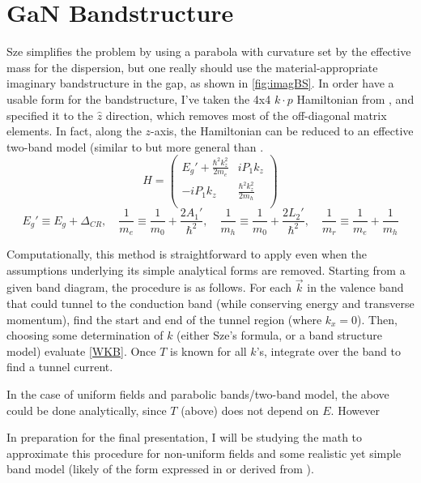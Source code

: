 \section{GaN Bandstructure}
Sze simplifies the problem by using a parabola with curvature set by the effective mass for the dispersion, but one really should use the material-appropriate imaginary bandstructure in the gap, as shown in \ref{fig:imagBS}.  In order have a usable form for the bandstructure, I've taken the 4x4 $k\cdot p$ Hamiltonian from \cite{Rinke_2008}, and specified it to the $\hat{z}$ direction, which removes most of the off-diagonal matrix elements.  In fact, along the $z$-axis, the Hamiltonian can be reduced to an effective two-band model (similar to but more general than \cite{Kane_1960}.
\[
  H=\begin{pmatrix}
    E_g'+\frac{\hbar^2k_z^2}{2m_e} & iP_1k_z\\
    -iP_1k_z & \frac{\hbar^2k_z^2}{2m_h} \\
  \end{pmatrix}
\]
\[
  E_g'\equiv E_g+\Delta_{CR}, \quad \frac{1}{m_e}\equiv\frac{1}{m_0}+\frac{2A_1'}{\hbar^2}, \quad \frac{1}{m_h}\equiv\frac{1}{m_0}+\frac{2L_2'}{\hbar^2}, \quad
\frac{1}{m_r}\equiv\frac{1}{m_e}+\frac{1}{m_h}
\]




Computationally, this method is straightforward to apply even when the assumptions underlying its simple analytical forms are removed.  Starting from a given band diagram, the procedure is as follows.  For each $\vec{k}$ in the valence band that could tunnel to the conduction band (while conserving energy and transverse momentum), find the start and end of the tunnel region (where $k_x=0$).  Then, choosing some determination of $k$ (either Sze's formula, or a band structure model) evaluate \ref{WKB}.  Once $T$ is known for all $k$'s, integrate over the band to find a tunnel current.



In the case of uniform fields and parabolic bands/two-band model, the above could be done analytically, since $T$ (above) does not depend on $E$.  However


In preparation for the final presentation, I will be studying the math to approximate this procedure for non-uniform fields and some realistic yet simple band model (likely of the form expressed in \cite{Guan_2011} or derived from \cite{Piprek}).